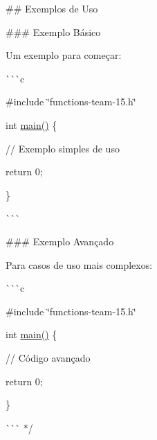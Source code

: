 
\begin{DoxyItemize}
\item 
\item \#\# Exemplos de Uso
\end{DoxyItemize}


\begin{DoxyItemize}
\item \#\#\# Exemplo Básico
\item Um exemplo para começar\+:
\item \`{}\`{}\`{}c
\item \#include \char`\"{}functions-\/team-\/15.\+h\char`\"{}
\item int \mbox{\hyperlink{main-team-15_8c_a3c04138a5bfe5d72780bb7e82a18e627}{main()}} \{
\item // Exemplo simples de uso
\item return 0;
\item \}
\item \`{}\`{}\`{}
\end{DoxyItemize}


\begin{DoxyItemize}
\item \#\#\# Exemplo Avançado
\item Para casos de uso mais complexos\+:
\item \`{}\`{}\`{}c
\item \#include \char`\"{}functions-\/team-\/15.\+h\char`\"{}
\item int \mbox{\hyperlink{main-team-15_8c_a3c04138a5bfe5d72780bb7e82a18e627}{main()}} \{
\item // Código avançado
\item return 0;
\item \}
\item \`{}\`{}\`{} $\ast$/ 
\end{DoxyItemize}